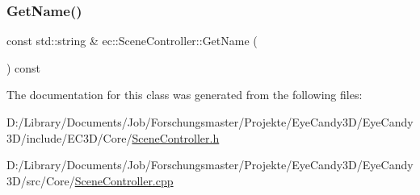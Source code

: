 \subsubsection{\texorpdfstring{Get\+Name()}{GetName()}}
{\footnotesize\ttfamily const std\+::string \& ec\+::\+Scene\+Controller\+::\+Get\+Name (\begin{DoxyParamCaption}{ }\end{DoxyParamCaption}) const}



The documentation for this class was generated from the following files\+:\begin{DoxyCompactItemize}
\item 
D\+:/\+Library/\+Documents/\+Job/\+Forschungsmaster/\+Projekte/\+Eye\+Candy3\+D/\+Eye\+Candy3\+D/include/\+E\+C3\+D/\+Core/\mbox{\hyperlink{_scene_controller_8h}{Scene\+Controller.\+h}}\item 
D\+:/\+Library/\+Documents/\+Job/\+Forschungsmaster/\+Projekte/\+Eye\+Candy3\+D/\+Eye\+Candy3\+D/src/\+Core/\mbox{\hyperlink{_scene_controller_8cpp}{Scene\+Controller.\+cpp}}\end{DoxyCompactItemize}
